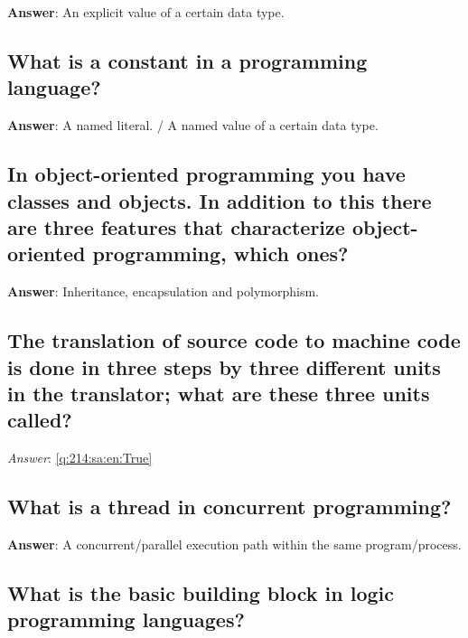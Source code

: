 \documentclass[a4paper,11pt,oneside]{article}
\begin{document}
\begin{sloppypar}
\textbf{Answer}: An explicit value of a certain data type.



\subsection{What is a constant in a programming language?}

\label{q:212:sa:en:True}

\textbf{Answer}: A named literal. / A named value of a certain data type.



\subsection{In object-oriented programming you have classes and objects. In addition to this there are three features that characterize object-oriented programming, which ones?}

\label{q:213:sa:en:True}

\textbf{Answer}: Inheritance, encapsulation and polymorphism.



\subsection{The translation of source code to machine code is done in three steps by three different units in the translator; what are these three units called?}

\label{q:214:sa:en:True}

\vspace{2cm}

\noindent\makebox[\textwidth]{\hrulefill}

\vspace{1cm}

\textit{Answer}: \autoref{q:214:sa:en:True}



\subsection{What is a thread in concurrent programming?}

\label{q:215:sa:en:True}

\textbf{Answer}: A concurrent/parallel execution path within the same program/process.



\subsection{What is the basic building block in logic programming languages?}


\end{sloppypar}
\end{document}
